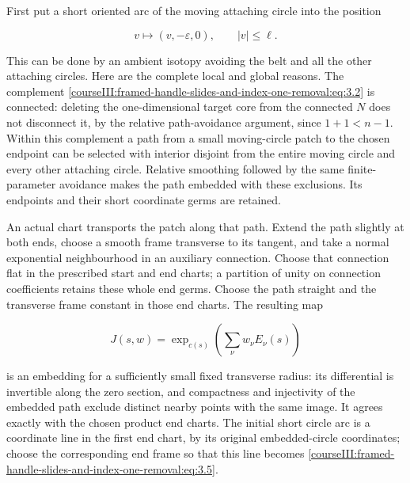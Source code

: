 First put a short oriented arc of the moving attaching circle into the position

\begin{equation}
v\longmapsto(v,-\varepsilon,0),\qquad |v|\leq\ell.
 \label{courseIII:framed-handle-slides-and-index-one-removal:eq:3.5}
\end{equation}

This can be done by an ambient isotopy avoiding the belt and all the other attaching circles. Here are the complete local and global reasons. The complement \eqref{courseIII:framed-handle-slides-and-index-one-removal:eq:3.2} is connected: deleting the one-dimensional target core from the connected \(N\) does not disconnect it, by the relative path-avoidance argument, since \(1+1<n-1\). Within this complement a path from a small moving-circle patch to the chosen endpoint can be selected with interior disjoint from the entire moving circle and every other attaching circle. Relative smoothing followed by the same finite-parameter avoidance makes the path embedded with these exclusions. Its endpoints and their short coordinate germs are retained.

An actual chart transports the patch along that path. Extend the path slightly at both ends, choose a smooth frame transverse to its tangent, and take a normal exponential neighbourhood in an auxiliary connection. Choose that connection flat in the prescribed start and end charts; a partition of unity on connection coefficients retains these whole end germs. Choose the path straight and the transverse frame constant in those end charts. The resulting map

\begin{equation}
J(s,w)=\exp_{c(s)}\left(\sum_\nu w_\nu E_\nu(s)\right)
 \label{courseIII:framed-handle-slides-and-index-one-removal:eq:3.6}
\end{equation}

is an embedding for a sufficiently small fixed transverse radius: its differential is invertible along the zero section, and compactness and injectivity of the embedded path exclude distinct nearby points with the same image. It agrees exactly with the chosen product end charts. The initial short circle arc is a coordinate line in the first end chart, by its original embedded-circle coordinates; choose the corresponding end frame so that this line becomes \eqref{courseIII:framed-handle-slides-and-index-one-removal:eq:3.5}.

